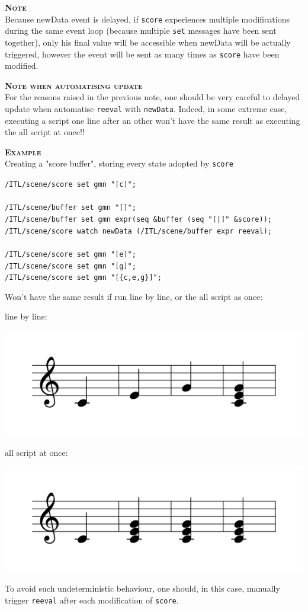 \documentclass[a4paper,twoside]{report}
\newcommand{\OSC}[1]		{\texttt{#1}}
\newcommand{\example}		{\textbf{\hspace{-1.5cm}\textbf{\textsc{Example }}}}
\newcommand{\note}	[1]		{\vspace{2mm}\textbf{\hspace{-1.03cm}\textbf{\textsc{Note #1}}}}
\newcommand{\sample}	[1]			{\vspace{-2mm}\begin{center}\colorbox{mygrey}{
								\begin{minipage}[t]{0.9\columnwidth} 
								{\small \texttt{#1}}
								\end{minipage}}\end{center}}
\begin{document}
\note\\
Because newData event is delayed, if \OSC{score} experiences multiple modifications during the same event loop (because multiple \OSC{set} messages have been sent together), only his final value will be accessible when newData will be actually triggered, however the event will be sent as many times as \OSC{score} have been modified.

\note {when automatising update}\\
For the reasons raised in the previous note, one should be very careful to delayed update when automatise \OSC{reeval} with \OSC{newData}. Indeed, in some extreme case, executing a script one line after an other won't have the same result as executing the all script at once!!

\pagebreak

\example\\
Creating a "score buffer", storing every state adopted by \OSC{score}
\sample{/ITL/scene/score set gmn "[c]";\\
\\
/ITL/scene/buffer set gmn "[]";\\
/ITL/scene/buffer set gmn expr(seq \&buffer (seq "[|]" \&score));\\
/ITL/scene/score watch newData (/ITL/scene/buffer expr reeval);\\
\\
/ITL/scene/score set gmn "[e]";\\
/ITL/scene/score set gmn "[g]";\\
/ITL/scene/score set gmn "[\{c,e,g\}]";
}
Won't have the same result if run line by line, or the all script as once:
\begin{multicols}{2}

line by line:
\begin{center}
 \includegraphics[scale=0.3]{imgs/autoSingleLine}
\end{center}

\columnbreak
all script at once:
\begin{center}
 \includegraphics[scale=0.3]{imgs/autoAllScript}
\end{center}

\end{multicols}

To avoid such undeterministic behaviour, one should, in this case, manually trigger \OSC{reeval} after each modification of \OSC{score}.


\printindex
\end{document}
